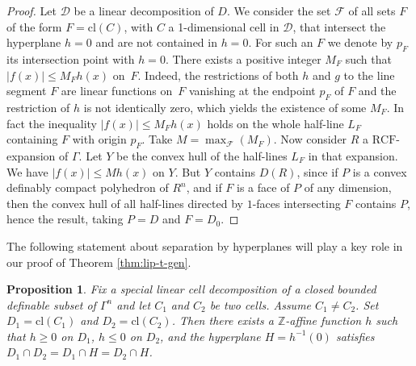 \documentclass[10pt]{amsart}
\newtheorem{prop}[subsection]{Proposition}
\theoremstyle{definition}
\theoremstyle{remark}
\newcommand{\cl}{\mathrm{cl}}
\newcommand{\Z}{\mathbb Z}
\theoremstyle{plain}
\theoremstyle{definition}
\begin{document}
\begin{proof}Let $\mathcal{D}$ be a linear decomposition of $D$.
We consider the set $\mathcal{F}$ of all sets $F$ of the form $F = \cl (C)$, with $C$ a 1-dimensional cell in $\mathcal{D}$,
that intersect the hyperplane $h = 0$ and are not contained in $h=0$.
For such an $F$ we denote by $p_F$ its intersection point with $h = 0$.
There exists a positive integer $M_F$ such that
$\vert f (x) \vert \leq M_F h (x)$ on~$F$. Indeed,
the restrictions of both $h$ and $g$ to the line segment $F$ are linear functions on~$F$ vanishing at the endpoint $p_F$ of $F$ and the restriction of $h$ is not identically zero, which yields the existence of
some $M_F$.
In fact the inequality $\vert f (x) \vert \leq M_F h (x)$ holds on the whole half-line $L_F$ containing $F$ with origin $p_F$.
Take $M = \max_{\mathcal{F}} (M_F)$. Now consider $R$ a $\mathrm{RCF}$-expansion of $\Gamma$. Let $Y$ be the convex hull of the half-lines $L_F$ in that expansion. We have $\vert f (x) \vert \leq M h (x)$ on $Y$.
But $Y$ contains $D (R)$, since if $P$ is a convex definably compact polyhedron of $R^n$, and if $F$ is a face of $P$ of any dimension, then the convex hull of all half-lines directed by $1$-faces intersecting $F$ contains $P$,
hence the result, taking $P = D$ and $F = D_0$.
\end{proof}

The following statement about separation by hyperplanes will play a key role in our proof of Theorem \ref{thm:lip-t-gen}.

\begin{prop}\label{prop:cell}Fix a special linear cell decomposition of a closed bounded definable subset of $\Gamma^n$ and let $C_1$ and $C_2$ be two cells.
Assume $C_1 \neq C_2$. Set $D_1 = \cl (C_1)$ and
$D_2 = \cl (C_2)$. Then there exists a $\Z$-affine function $h$ such that $h \geq 0$ on $D_1$,
$h \leq 0$ on $D_2$, and
the hyperplane $H =h^{-1}(0)$ satisfies $D_1\cap D_2 =D_1 \cap H=D_2\cap H$.
\end{prop}
\end{document}
